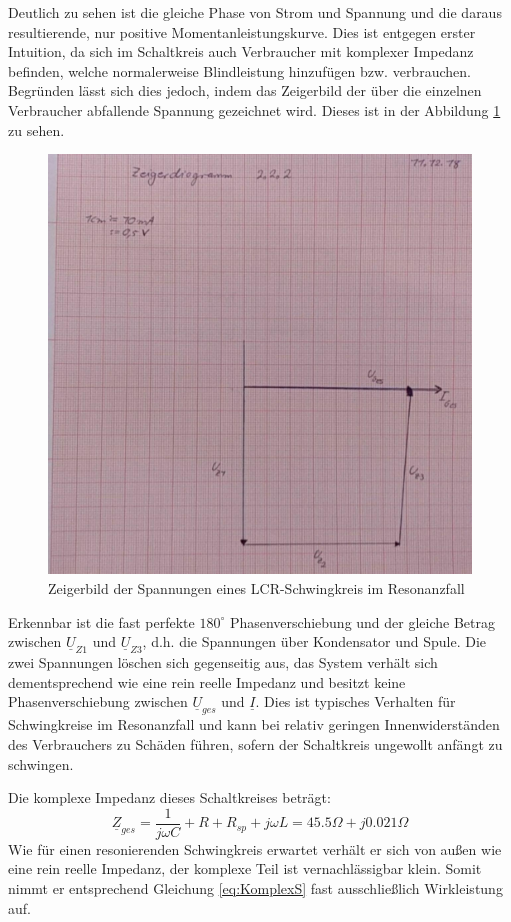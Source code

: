 Deutlich zu sehen ist die gleiche Phase von Strom und Spannung und die daraus resultierende, nur positive Momentanleistungskurve. Dies ist entgegen erster Intuition, da sich im Schaltkreis auch Verbraucher mit komplexer Impedanz befinden, welche normalerweise Blindleistung hinzufügen bzw. verbrauchen.
Begründen lässt sich dies jedoch, indem das Zeigerbild der über die einzelnen Verbraucher abfallende Spannung gezeichnet wird. Dieses ist in der Abbildung \ref{fig:ZeigerbildResonanz} zu sehen.

\begin{figure}[H]
\centering
\includegraphics[width=0.7\linewidth]{Images/Zeigerdiagramm2-2-2.jpg}
\caption{Zeigerbild der Spannungen eines LCR-Schwingkreis im Resonanzfall}
\label{fig:ZeigerbildResonanz}
\end{figure}

Erkennbar ist die fast perfekte $180^\circ$ Phasenverschiebung und der gleiche Betrag zwischen $\underline{U}_{Z1}$ und $\underline{U}_{Z3}$, d.h. die Spannungen über Kondensator und Spule. Die zwei Spannungen löschen sich gegenseitig aus, das System verhält sich dementsprechend wie eine rein reelle Impedanz und besitzt keine Phasenverschiebung zwischen $\underline{U}_{ges}$ und $\underline{I}$. Dies ist typisches Verhalten für Schwingkreise im Resonanzfall und kann bei relativ geringen Innenwiderständen des Verbrauchers zu Schäden führen, sofern der Schaltkreis ungewollt anfängt zu schwingen.

Die komplexe Impedanz dieses Schaltkreises beträgt:
\begin{equation*}
\underline{Z}_{ges} = \frac{1}{j\omega C} + R + R_{sp} + j\omega L = 45.5\Omega + j0.021\Omega
\end{equation*}
Wie für einen resonierenden Schwingkreis erwartet verhält er sich von außen wie eine rein reelle Impedanz, der komplexe Teil ist vernachlässigbar klein. Somit nimmt er entsprechend Gleichung \eqref{eq:KomplexS} fast ausschließlich Wirkleistung auf.
